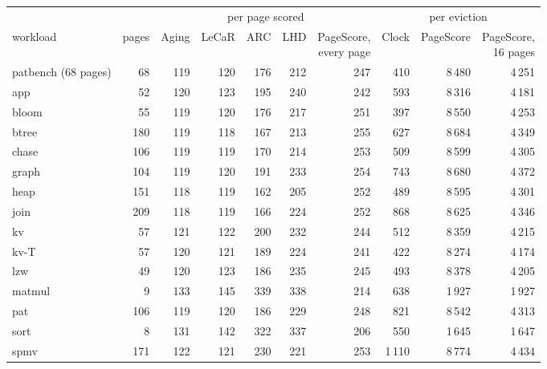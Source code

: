 \begin{tabular}{lrrrrrrrrr}
\toprule
 & & \multicolumn{5}{c}{per page scored} & \multicolumn{3}{c}{per eviction} \\
\cmidrule(lr){3-7}\cmidrule(l){8-10}
workload & pages & Aging & LeCaR & ARC & LHD & \shortstack[r]{PageScore,\\every page} & Clock & PageScore & \shortstack[r]{PageScore,\\16 pages} \\
\midrule
patbench (68 pages) & 68 & 119 & 120 & 176 & 212 & 247 & 410 & 8\,480 & 4\,251 \\
app & 52 & 120 & 123 & 195 & 240 & 242 & 593 & 8\,316 & 4\,181 \\
bloom & 55 & 119 & 120 & 176 & 217 & 251 & 397 & 8\,550 & 4\,253 \\
btree & 180 & 119 & 118 & 167 & 213 & 255 & 627 & 8\,684 & 4\,349 \\
chase & 106 & 119 & 119 & 170 & 214 & 253 & 509 & 8\,599 & 4\,305 \\
graph & 104 & 119 & 120 & 191 & 233 & 254 & 743 & 8\,680 & 4\,372 \\
heap & 151 & 118 & 119 & 162 & 205 & 252 & 489 & 8\,595 & 4\,301 \\
join & 209 & 118 & 119 & 166 & 224 & 252 & 868 & 8\,625 & 4\,346 \\
kv & 57 & 121 & 122 & 200 & 232 & 244 & 512 & 8\,359 & 4\,215 \\
kv-T & 57 & 120 & 121 & 189 & 224 & 241 & 422 & 8\,274 & 4\,174 \\
lzw & 49 & 120 & 123 & 186 & 235 & 245 & 493 & 8\,378 & 4\,205 \\
matmul & 9 & 133 & 145 & 339 & 338 & 214 & 638 & 1\,927 & 1\,927 \\
pat & 106 & 119 & 120 & 186 & 229 & 248 & 821 & 8\,542 & 4\,313 \\
sort & 8 & 131 & 142 & 322 & 337 & 206 & 550 & 1\,645 & 1\,647 \\
spmv & 171 & 122 & 121 & 230 & 221 & 253 & 1\,110 & 8\,774 & 4\,434 \\
\bottomrule
\end{tabular}
